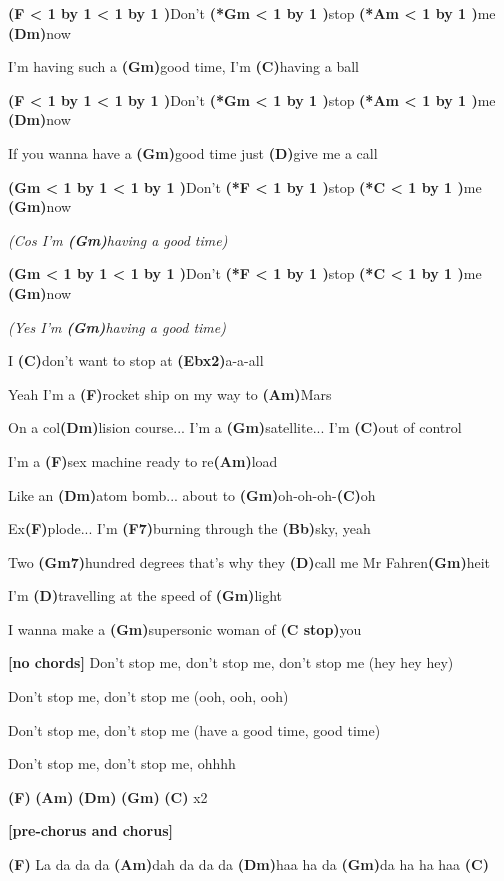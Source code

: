 \documentclass{article}
\newenvironment{song}{%
	\pagebreak%
	\parindent0pt%
    \Large%
}{%
}%
\newlength{\chboxsep}
\newlength{\savedfboxsep}
\newenvironment{chorusbox}{%
    \hspace{-\chboxsep}%
    \begin{lrbox}{\chbox}%
    \begin{minipage}{\linewidth-3ex}%
}{%
    \end{minipage}%
    \end{lrbox}%
    \setlength{\savedfboxsep}{\fboxsep}%
    \setlength{\fboxsep}{\chboxsep}%
    \fbox{\usebox{\chbox}}%
    \setlength{\fboxsep}{\savedfboxsep}%
}
\newcommand{\ch}[1]{\textbf{(#1)}}
\newcommand{\rep}[1]{\hspace{2pt}x#1}
\newcommand{\beatsymbol}{\textquotesingle}
\newcommand{\beats}[1]{%
  \myloopcounter0%
  \loop\ifnum\myloopcounter < #1 %
  \beatsymbol%
  \advance\myloopcounter by 1 %
  \repeat %
}
\newcommand{\beat}{\beats1}
\newcommand{\note}[1]{\textbf{[#1]}}
\begin{document}
\begin{song}
\begin{chorusbox}
\bigskip

\ch{F\beat\beat}Don’t \ch{*Gm\beat}stop \ch{*Am\beat}me \ch{Dm}now \par
I’m having such a \ch{Gm}good time, I’m \ch{C}having a ball \par
\ch{F\beat\beat}Don’t \ch{*Gm\beat}stop \ch{*Am\beat}me \ch{Dm}now \par
If you wanna have a \ch{Gm}good time just \ch{D}give me a call \par
\ch{Gm\beat\beat}Don’t \ch{*F\beat}stop \ch{*C\beat}me \ch{Gm}now \par
\hspace{120pt} \textit{(Cos I’m \ch{Gm}having a good time)} \par
\ch{Gm\beat\beat}Don’t \ch{*F\beat}stop \ch{*C\beat}me \ch{Gm}now \par
\hspace{120pt} \textit{(Yes I’m \ch{Gm}having a good time)} \par
I \ch{C}don’t want to stop at \ch{Eb\rep2}a-a-all
\end{chorusbox}

\bigskip

Yeah I’m a \ch{F}rocket ship on my way to \ch{Am}Mars \par
On a col\ch{Dm}lision course... I’m a \ch{Gm}satellite... I’m \ch{C}out of control \par
I’m a \ch{F}sex machine ready to re\ch{Am}load \par
Like an \ch{Dm}atom bomb... about to \ch{Gm}oh-oh-oh-\ch{C}oh \par

\bigskip

Ex\ch{F}plode... I’m \ch{F7}burning through the \ch{Bb}sky, yeah \par
Two \ch{Gm7}hundred degrees that’s why they \ch{D}call me Mr Fahren\ch{Gm}heit \par
I’m \ch{D}travelling at the speed of \ch{Gm}light \par
I wanna make a \ch{Gm}supersonic woman of \ch{C stop}you \par

\bigskip

\note{no chords} Don’t stop me, don’t stop me, don’t stop me (hey hey hey) \par
Don’t stop me, don’t stop me (ooh, ooh, ooh) \par
Don’t stop me, don’t stop me (have a good time, good time) \par
Don’t stop me, don’t stop me, ohhhh \par
\ch{F} \ch{Am} \ch{Dm} \ch{Gm} \ch{C} x2 \par

\bigskip

\note{pre-chorus and chorus} \par

\bigskip

\ch{F} La da da da \ch{Am}dah da da da \ch{Dm}haa ha da \ch{Gm}da ha ha haa \ch{C} \par

\end{song}
\end{document}
